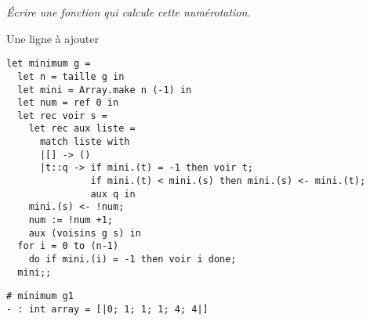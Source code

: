 \begin{Exercise}\it 
Écrire une fonction  qui calcule cette numérotation.
\end{Exercise} 
\begin{Answer}
Une ligne à ajouter
\begin{lstlisting}
let minimum g = 
  let n = taille g in
  let mini = Array.make n (-1) in
  let num = ref 0 in
  let rec voir s =
    let rec aux liste = 
      match liste with
      |[] -> ()
      |t::q -> if mini.(t) = -1 then voir t;
               if mini.(t) < mini.(s) then mini.(s) <- mini.(t);
               aux q in
    mini.(s) <- !num;
    num := !num +1;
    aux (voisins g s) in
  for i = 0 to (n-1) 
    do if mini.(i) = -1 then voir i done;
  mini;;
\end{lstlisting}
\newpage
\end{Answer} 
\begin{lstlisting}
# minimum g1
- : int array = [|0; 1; 1; 1; 4; 4|]
\end{lstlisting}
